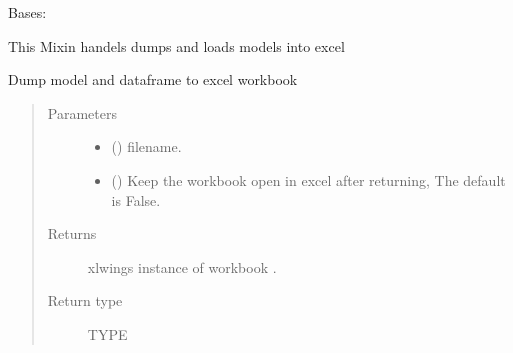 \documentclass[letterpaper,10pt,english]{sphinxmanual}
\begin{document}

\begin{fulllineitems}
\label{\detokenize{core/modelclass:modelclass.Excel_Mixin}}
\pysigstartsignatures
{}
\pysigstopsignatures
\sphinxAtStartPar
Bases: 

\sphinxAtStartPar
This Mixin handels dumps and loads models into excel

\begin{fulllineitems}
\label{\detokenize{core/modelclass:modelclass.Excel_Mixin.modeldump_excel}}
\pysigstartsignatures
{}
\pysigstopsignatures
\sphinxAtStartPar
Dump model and dataframe to excel workbook
\begin{quote}\begin{description}
\item[{Parameters}] \leavevmode\begin{itemize}
\item {} 
\sphinxAtStartPar
{} () \textendash{} filename.

\item {} 
\sphinxAtStartPar
{} (\sphinxstyleliteralemphasis{\sphinxupquote{, }}) \textendash{} Keep the workbook open in excel after returning,  The default is False.

\end{itemize}

\item[{Returns}] \leavevmode
\sphinxAtStartPar
{} \textendash{} xlwings instance of workbook .

\item[{Return type}] \leavevmode
\sphinxAtStartPar
TYPE


\end{description}
\end{quote}
\end{fulllineitems}
\end{fulllineitems}
\end{document}
